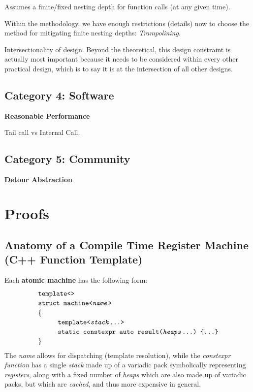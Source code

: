 \documentclass[twoside]{article}
\newcommand{\strong}[1]{{\bfseries #1}}
\newcommand{\tab}[1][1.125cm]{\hspace{#1}}
\begin{document}
\begin{center}
Assumes a finite/fixed nesting depth for function calls (at any given time).
\end{center}

Within the methodology, we have enough restrictions (details) now to choose the method for mitigating finite
nesting depths: \emph{Trampolining}.

Intersectionality of design. Beyond the theoretical, this design constraint is actually most important because
it needs to be considered within every other practical design, which is to say it is at the intersection of all
other designs.

\subsection*{Category 4: Software}

\strong{Reasonable Performance}

Tail call vs Internal Call.

\subsection*{Category 5: Community}

\strong{Detour Abstraction}

\section*{Proofs}

\subsection*{Anatomy of a Compile Time Register Machine (C++ Function Template)}

\noindent Each \strong{atomic machine} has the following form:
$$ \def\arraystretch{1.15}
\tab[0cm] \begin{array}{l}
\texttt{template<>}									\\
\texttt{struct machine<\emph{name}>}							\\
\{											\\
\tab[1cm]\texttt{template<\emph{stack}\ldots>}						\\
\tab[1cm]\texttt{static constexpr auto result(\emph{heaps}\ldots)\ \{\ldots\}}		\\
\}
\end{array} $$
The \emph{name} allows for dispatching (template resolution), while the \emph{constexpr function}
has a single \emph{stack} made up of a variadic pack symbolically representing \emph{registers},
along with a fixed number of \emph{heaps} which are also made up of variadic packs, but which
are \emph{cached}, and thus more expensive in general.
\end{document}
